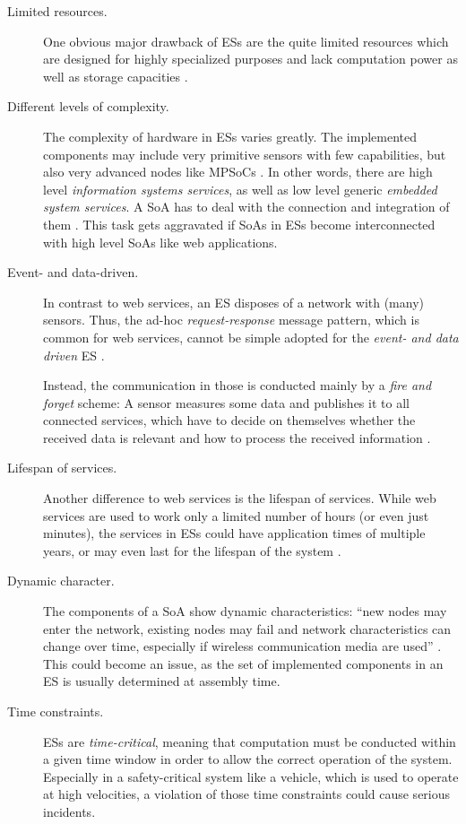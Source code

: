 \begin{description}
\item [Limited resources.]
One obvious major drawback of ESs are the quite limited resources which are designed for highly specialized purposes and lack computation power as well as storage capacities \cite{rodrigues2011} \cite{scholz} \cite{sommer}.

\item [Different levels of complexity.]
The complexity of hardware in ESs varies greatly. The implemented components may include very primitive sensors with few capabilities, but also very advanced nodes like MPSoCs \cite{scholz} \cite{sommer}. In other words, there are high level \emph{information systems services}, as well as low level generic \emph{embedded system services}. A SoA has to deal with the connection and integration of them \cite{rodrigues2011}. This task gets aggravated if SoAs in ESs become interconnected with high level SoAs like web applications.

\item [Event- and data-driven.]
In contrast to web services, an ES disposes of a network with (many) sensors. Thus, the ad-hoc \emph{request-response} message pattern, which is common for web services, cannot be simple adopted for the \emph{event- and data driven} ES \cite{sommer}.

Instead, the communication in those is conducted mainly by a \emph{fire and forget} scheme: A sensor measures some data and publishes it to all connected services, which have to decide on themselves whether the received data is relevant and how to process the received information \cite{sommer}.

\item [Lifespan of services.]
Another difference to web services is the lifespan of services. While web services are used to work only a limited number of hours (or even just minutes), the services in ESs could have application times of multiple years, or may even last for the lifespan of the system \cite{buckl}.

\item [Dynamic character.] 
The components of a SoA show dynamic characteristics: ``new nodes may enter the network, existing nodes may fail and network characteristics can change over time, especially if wireless communication media are used'' \cite{sommer}. This could become an issue, as the set of implemented components in an ES is usually determined at assembly time.

\item [Time constraints.]
ESs are \emph{time-critical}, meaning that computation must be conducted within a given time window in order to allow the correct operation of the system. Especially in a safety-critical system like a vehicle, which is used to operate at high velocities, a violation of those time constraints could cause serious incidents.
\end{description}

